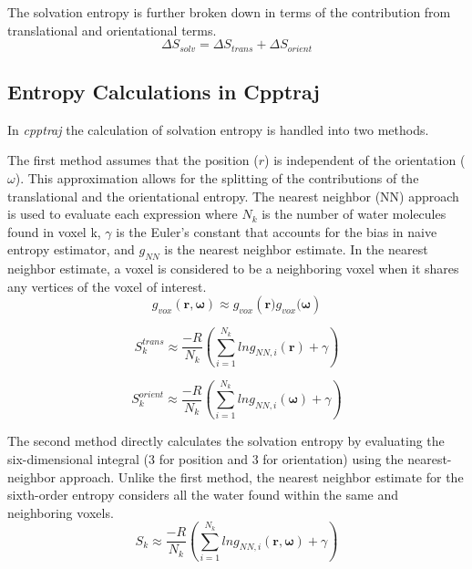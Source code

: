 \documentclass[9pt,tutorial]{livecoms}
\newcommand{\software}{\emph}
\begin{document}
The solvation entropy is further broken down in terms of the contribution from translational and orientational terms.
\begin{equation}
	\Delta S_\textit{solv} = \Delta S_\textit{trans} + \Delta S_\textit{orient}
\end{equation}

\subsection{Entropy Calculations in Cpptraj}
In \software{cpptraj} the calculation of  solvation entropy is handled into two methods.

The first method assumes that the position ($r$) is independent of the orientation ($\omega$). This approximation allows for the 
splitting of the contributions of the translational and the orientational entropy. The nearest neighbor (NN) approach is used to 
evaluate each expression where $N_\textit{k}$ is the number of water molecules found in voxel k, $\gamma$ is the Euler's constant 
that accounts for the bias in naive entropy estimator, and $g_\textit{NN}$ is the nearest neighbor estimate. In the nearest neighbor
estimate, a voxel is considered to be a neighboring voxel when it shares any vertices of the voxel of interest. 
\begin{equation}
	g_\textit{vox} \left( \textbf{r}, \mathbf{\omega} \right) \approx g_\textit{vox} \left( \textbf{r})g_\textit{vox}(\mathbf{\omega} \right)
\end{equation}

\begin{equation}
	S_{k}^\textit{trans} \approx \frac{-R}{N_\textit{k}} \left( \sum _{i=1}^{N_k} ln g_{NN, \textit{i}} \left( \textbf{r} \right) + \gamma \right)
\end{equation}


\begin{equation}
	S_{k}^\textit{orient} \approx \frac{-R}{N_\textit{k}} \left( \sum _{i=1}^{N_k} ln g_{NN, \textit{i}} \left( \mathbf {\omega} \right) + \gamma \right)
\end{equation}

The second method directly calculates the solvation entropy by evaluating the six-dimensional integral (3 for position and 3 for orientation) 
using the nearest-neighbor approach. Unlike the first method, the nearest neighbor estimate for the sixth-order entropy considers all the water 
found within the same and neighboring voxels.  
\begin{equation}
	S_\textit{k} \approx \frac{-R}{N_\textit{k}} \left( \sum _{i=1}^{N_k} ln g_{NN, \textit{i}} \left( \textbf{r}, \mathbf {\omega} \right) + \gamma \right)
\end{equation}
\end{document}
